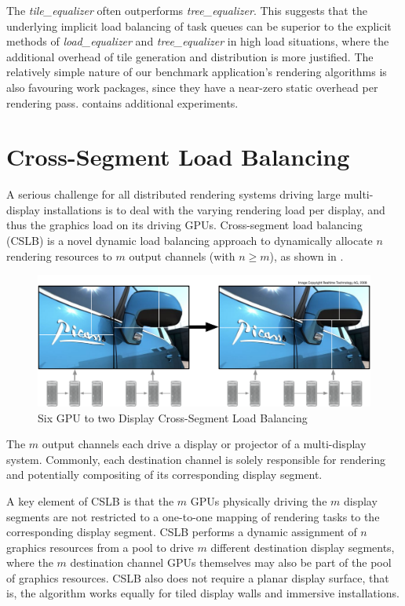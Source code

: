 The {\em tile\_equalizer} often outperforms {\em tree\_equalizer}. This
suggests that the underlying implicit load balancing of task queues can be
superior to the explicit methods of {\em load\_equalizer} and
{\em tree\_equalizer} in high load situations, where the additional overhead
of tile generation and distribution is more justified. The relatively simple
nature of our benchmark application's rendering algorithms is also favouring
work packages, since they have a near-zero static overhead per rendering pass.
\cite{SPEP:16} contains additional experiments.

\section{Cross-Segment Load Balancing}

A serious challenge for all distributed rendering systems driving large
multi-display installations is to deal with the varying rendering load per
display, and thus the graphics load on its driving GPUs. Cross-segment load
balancing (CSLB) is a novel dynamic load balancing approach to dynamically
allocate $n$ rendering resources to $m$ output channels (with $n\geq m$), as
shown in .

\begin{figure}[h!t]
  \includegraphics[width=\textwidth]{images/vieweq}
  \caption{\label{fvieweq}Six GPU to two Display Cross-Segment Load Balancing}
\end{figure}

The $m$ output channels each drive a display or projector of a multi-display
system. Commonly, each destination channel is solely responsible for rendering
and potentially compositing of its corresponding display segment.

A key element of CSLB is that the $m$ GPUs physically driving the $m$ display
segments are not restricted to a one-to-one mapping of rendering tasks to the
corresponding display segment. CSLB performs a dynamic assignment of $n$
graphics resources from a pool to drive $m$ different destination display
segments, where the $m$ destination channel GPUs themselves may also be part of
the pool of graphics resources. CSLB also does not require a planar display
surface, that is, the algorithm works equally for tiled display walls and
immersive installations.

